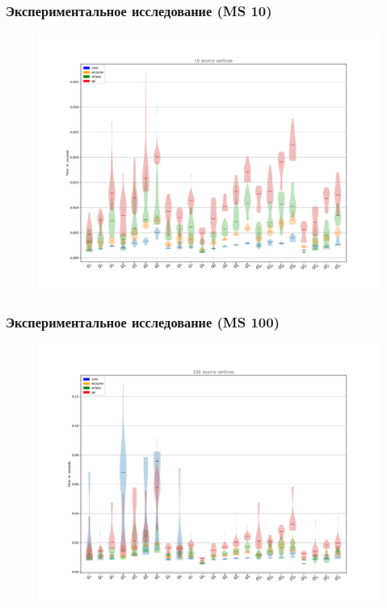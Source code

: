 \documentclass{beamer}
\begin{document}
\begin{frame}[fragile]
  \frametitle{Экспериментальное исследование (MS 10)}
  \noindent\begin{minipage}{0.95\textwidth}
  \begin{figure}[h!]
      \includegraphics[width=1\linewidth]{pictures/ms10.pdf}
  \end{figure}
\end{minipage}
\end{frame}

\begin{frame}[fragile]
  \frametitle{Экспериментальное исследование (MS 100)}
  \noindent\begin{minipage}{0.95\textwidth}
  \begin{figure}[h!]
      \includegraphics[width=1\linewidth]{pictures/ms100.pdf}
  \end{figure}
\end{minipage}
\end{frame}
\end{document}
